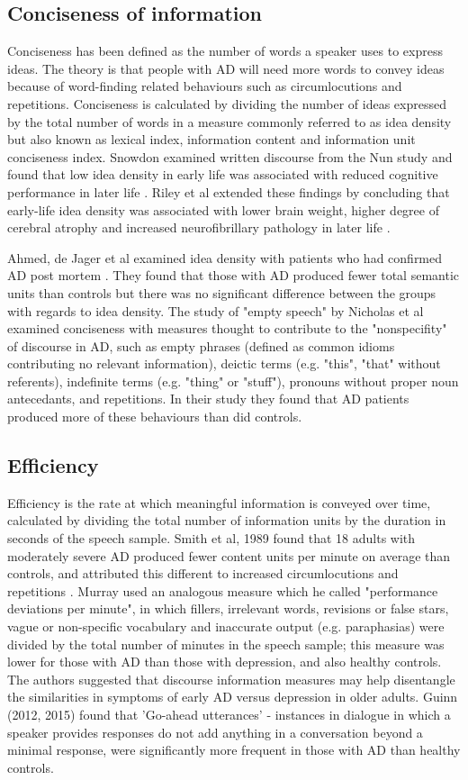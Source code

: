\documentclass[10pt, letterpaper, twoside, openany]{book}
\begin{document}
\subsection{Conciseness of information}
Conciseness has been defined as the number of words a speaker uses to express ideas. The theory is that people with AD will need more words to convey ideas because of word-finding related behaviours such as circumlocutions and repetitions. Conciseness is calculated by dividing the number of ideas expressed by the total number of words in a measure commonly referred to as idea density but also known as lexical index, information content and information unit conciseness index. Snowdon examined written discourse from the Nun study and found that low idea density in early life was associated with reduced cognitive performance in later life \cite{Snowdon1996}. Riley et al extended these findings by concluding that early-life idea density was associated with lower brain weight, higher degree of cerebral atrophy and increased neurofibrillary pathology in later life \cite{Riley2005}.
\par
Ahmed, de Jager et al examined idea density with patients who had confirmed AD post mortem \cite{Ahmed2013}. They found that those with AD produced fewer total semantic units than controls but there was no significant difference between the groups with regards to idea density. The study of "empty speech" by Nicholas et al examined conciseness with measures thought to contribute to the "nonspecifity" of discourse in AD, such as empty phrases (defined as common idioms contributing no relevant information), deictic terms (e.g. "this", "that" without referents), indefinite terms (e.g. "thing" or "stuff"), pronouns without proper noun antecedants, and repetitions. In their study they found that AD patients produced more of these behaviours than did controls.
\par
\subsection{Efficiency}
Efficiency is the rate at which meaningful information is conveyed over time, calculated by dividing the total number of information units by the duration in seconds of the speech sample. Smith et al, 1989 found that 18 adults with moderately severe AD produced fewer content units per minute on average than controls, and attributed this different to increased circumlocutions and repetitions \cite{Smith1989}. Murray used an analogous measure which he called "performance deviations per minute", in which fillers, irrelevant words, revisions or false stars, vague or non-specific vocabulary and inaccurate output (e.g. paraphasias) were divided by the total number of minutes in the speech sample; this measure was lower for those with AD than those with depression, and also healthy controls. The authors suggested that discourse information measures may help disentangle the similarities in symptoms of early AD versus depression in older adults. Guinn (2012, 2015) \cite{Guinn2012, Guinn2015} found that 'Go-ahead utterances' - instances in dialogue in which a speaker provides responses do not add anything in a conversation beyond a minimal response, were significantly more frequent in those with AD than healthy controls.
\end{document}
